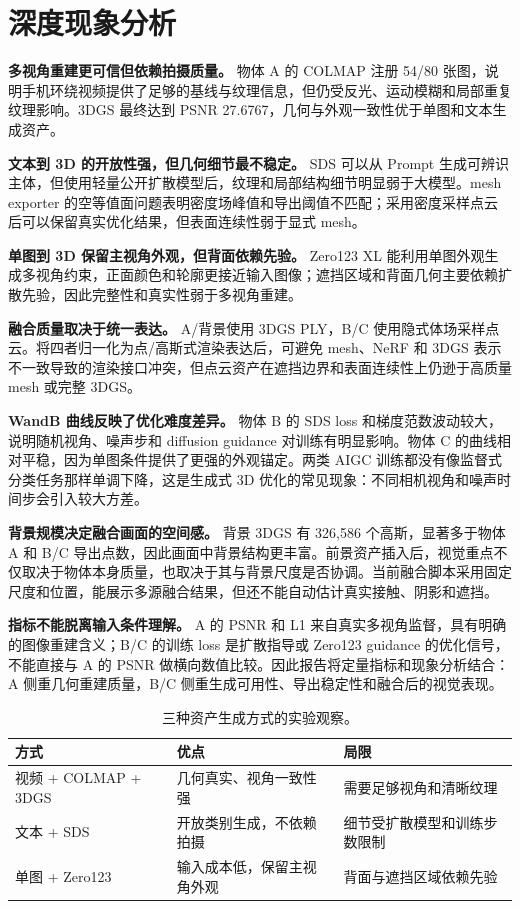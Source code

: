 \documentclass[10pt,twocolumn]{ctexart}
\begin{document}
\section{深度现象分析}
\textbf{多视角重建更可信但依赖拍摄质量。} 物体 A 的 COLMAP 注册 54/80 张图，说明手机环绕视频提供了足够的基线与纹理信息，但仍受反光、运动模糊和局部重复纹理影响。3DGS 最终达到 PSNR 27.6767，几何与外观一致性优于单图和文本生成资产。

\textbf{文本到 3D 的开放性强，但几何细节最不稳定。} SDS 可以从 Prompt 生成可辨识主体，但使用轻量公开扩散模型后，纹理和局部结构细节明显弱于大模型。mesh exporter 的空等值面问题表明密度场峰值和导出阈值不匹配；采用密度采样点云后可以保留真实优化结果，但表面连续性弱于显式 mesh。

\textbf{单图到 3D 保留主视角外观，但背面依赖先验。} Zero123 XL 能利用单图外观生成多视角约束，正面颜色和轮廓更接近输入图像；遮挡区域和背面几何主要依赖扩散先验，因此完整性和真实性弱于多视角重建。

\textbf{融合质量取决于统一表达。} A/背景使用 3DGS PLY，B/C 使用隐式体场采样点云。将四者归一化为点/高斯式渲染表达后，可避免 mesh、NeRF 和 3DGS 表示不一致导致的渲染接口冲突，但点云资产在遮挡边界和表面连续性上仍逊于高质量 mesh 或完整 3DGS。

\textbf{WandB 曲线反映了优化难度差异。} 物体 B 的 SDS loss 和梯度范数波动较大，说明随机视角、噪声步和 diffusion guidance 对训练有明显影响。物体 C 的曲线相对平稳，因为单图条件提供了更强的外观锚定。两类 AIGC 训练都没有像监督式分类任务那样单调下降，这是生成式 3D 优化的常见现象：不同相机视角和噪声时间步会引入较大方差。

\textbf{背景规模决定融合画面的空间感。} 背景 3DGS 有 326,586 个高斯，显著多于物体 A 和 B/C 导出点数，因此画面中背景结构更丰富。前景资产插入后，视觉重点不仅取决于物体本身质量，也取决于其与背景尺度是否协调。当前融合脚本采用固定尺度和位置，能展示多源融合结果，但还不能自动估计真实接触、阴影和遮挡。

\textbf{指标不能脱离输入条件理解。} A 的 PSNR 和 L1 来自真实多视角监督，具有明确的图像重建含义；B/C 的训练 loss 是扩散指导或 Zero123 guidance 的优化信号，不能直接与 A 的 PSNR 做横向数值比较。因此报告将定量指标和现象分析结合：A 侧重几何重建质量，B/C 侧重生成可用性、导出稳定性和融合后的视觉表现。

\begin{table}[H]
  \centering
  \caption{三种资产生成方式的实验观察。}
  \label{tab:compare}
  \small
  \begin{tabularx}{\columnwidth}{@{}l X X@{}}
    \toprule
    方式 & 优点 & 局限 \\
    \midrule
    视频 + COLMAP + 3DGS & 几何真实、视角一致性强 & 需要足够视角和清晰纹理 \\
    文本 + SDS & 开放类别生成，不依赖拍摄 & 细节受扩散模型和训练步数限制 \\
    单图 + Zero123 & 输入成本低，保留主视角外观 & 背面与遮挡区域依赖先验 \\
    \bottomrule
  \end{tabularx}
\end{table}
\end{document}
